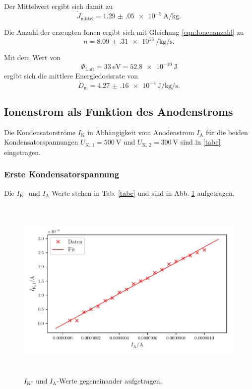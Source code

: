 \noindent Der Mittelwert ergibt sich damit zu 
\begin{equation*}
    \dot{J}_\text{mittel} = \SI{1.29(05)e-5}{\ampere\per\kilo\gram}.
\end{equation*}

\noindent Die Anzahl der erzeugten Ionen ergibt sich mit Gleichung \eqref{eqn:Ionenanzahl} zu 
\begin{equation*}
    n = \SI{8.09(31)e13}{\per\kilo\gram\per\second}.
\end{equation*}

\noindent Mit dem Wert \cite{Luft} von 
\begin{equation*}
    \Phi_\text{Luft} = \SI{33}{\electronvolt} = \SI{52.8e-19}{\joule}
\end{equation*}
ergibt sich die mittlere Energiedosisrate von 
\begin{equation*}
    \dot{D}_\text{m} = \SI{4.27(16)e-4}{\joule\per\kilo\gram\per\second}.
\end{equation*}



\subsection{Ionenstrom als Funktion des Anodenstroms}

Die Kondensatorströme $I_\text{K}$ in Abhängigkeit vom
Anodenstrom $I_\text{A}$ für die beiden Kondensatorspannungen
$U_\text{K, 1} = \SI{500}{\volt}$ und $U_\text{K, 2} = \SI{300}{\volt}$
sind in \ref{tabc} eingetragen.

\subsubsection{Erste Kondensatorspannung}
Die $I_\text{K}$- und $I_\text{A}$-Werte stehen in Tab. \ref{tabc} und sind in Abb. \ref{fig:plot1} aufgetragen. 



\begin{figure}
    \centering
    \includegraphics[width=15cm, height=9cm]{build/plot1.pdf}
    \caption{$I_\text{K}$- und $I_\text{A}$-Werte gegeneinander aufgetragen.}
    \label{fig:plot1}
\end{figure}


